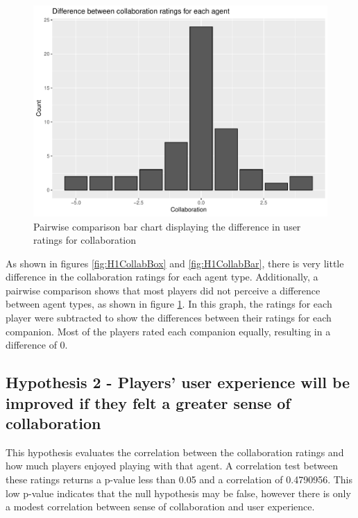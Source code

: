 \documentclass{IEEEtran}
\begin{document}
\begin{figure}
  \centering
  \includegraphics[width=\linewidth]{Images/Graphs/H1CollabPairBar.pdf}
  
\caption{Pairwise comparison bar chart displaying the difference in user ratings for collaboration}
\label{fig:H1CollabPairBar}
\end{figure}

As shown in figures \ref{fig:H1CollabBox} and \ref{fig:H1CollabBar}, there is very little difference in the collaboration ratings for each agent type. Additionally, a pairwise comparison shows that most players did not perceive a difference between agent types, as shown in figure \ref{fig:H1CollabPairBar}. In this graph, the ratings for each player were subtracted to show the differences between their ratings for each companion. Most of the players rated each companion equally, resulting in a difference of 0.

\subsection{Hypothesis 2 - Players' user experience will be improved if they felt a greater sense of collaboration}

This hypothesis evaluates the correlation between the collaboration ratings and how much players enjoyed playing with that agent. A correlation test between these ratings returns a p-value less than 0.05 and a correlation of 0.4790956. This low p-value indicates that the null hypothesis may be false, however there is only a modest correlation between sense of collaboration and user experience.
\end{document}
